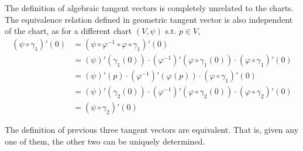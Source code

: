 \documentclass{article}
\begin{document}
\begin{remark}
    The definition of algebraic tangent vectors is completely unrelated to the charts. The equivalence relation defined in geometric tangent vector is also independent of the chart, as for a different chart $(V, \psi)$ s.t. $p \in V$,
    \begin{align*}
        (\psi \circ \gamma_1)'(0) 
        & = (\psi \circ \varphi^{-1} \circ \varphi \circ \gamma_1)'(0) \\
        & = (\psi)'(\gamma_1(0)) \cdot (\varphi^{-1})'(\varphi \circ \gamma_1(0)) \cdot (\varphi \circ \gamma_1)'(0) \\
        & = (\psi)'(p) \cdot (\varphi^{-1})'(\varphi(p)) \cdot (\varphi \circ \gamma_1)'(0) \\
        & = (\psi)'(\gamma_2(0)) \cdot (\varphi^{-1})'(\varphi \circ \gamma_2(0)) \cdot (\varphi \circ \gamma_2)'(0) \\
        & = (\psi \circ \gamma_2)'(0)
    \end{align*}
\end{remark}

\begin{theorem}
    The definition of previous three tangent vectors are equivalent. That is, given any one of them, the other two can be uniquely determined.
\end{theorem}
\end{document}
